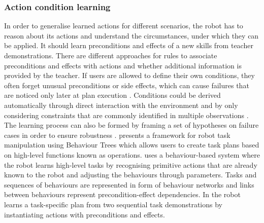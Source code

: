 \subsubsection{Action condition learning}\label{sssec:Action condition learning}
In order to generalise learned actions for different scenarios, the robot has to reason about its actions and understand the circumstances, under which they can be applied. 
It should learn preconditions and effects of a new skills from teacher demonstrations.
There are different approaches for rules to associate preconditions and effects with actions and whether additional information is provided by the teacher.
If users are allowed to define their own conditions, they often forget unusual preconditions or side effects, which can cause failures that are noticed only later at plan execution \cite{gil1994learning}.
Conditions could be derived automatically through direct interaction with the environment and by only considering constraints that are commonly identified in multiple observations \cite{ekvall2008robot}.
The learning process can also be formed by framing a set of hypotheses on failure cases in order to ensure robustness \cite{yildiz2013learning}.
\cite{guerin2015framework} presents a framework for robot task manipulation using Behaviour Trees which allows users to create task plans based on high-level functions known as operations.
\cite{nicolescu2003natural} uses a behaviour-based system where the robot learns high-level tasks by recognising primitive actions that are already known to the robot and adjusting the behaviours through parameters.
Tasks and sequences of behaviours are represented in form of behaviour networks and links between behaviours represent precondition-effect dependencies.
In \cite{veeraraghavan2008teaching} the robot learns a task-specific plan from two sequential task demonstrations by instantiating actions with preconditions and effects.

